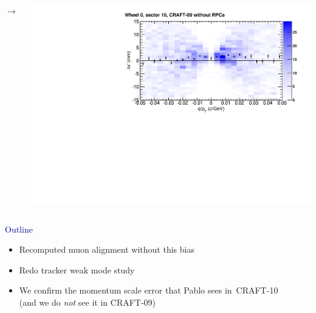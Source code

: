\documentclass[compress]{beamer}
\begin{document}
\begin{frame}
\begin{columns}
$\mathbf{\to}$

\includegraphics[width=0.9\linewidth]{globaldistort_noRPC.pdf}
\end{columns}

\vspace{0.2 cm}
\hspace{-0.83 cm} \textcolor{darkblue}{\Large Outline}

\begin{itemize}
\item Recomputed muon alignment without this bias
\item Redo tracker weak mode study
\item We confirm the momentum scale error that Pablo sees \mbox{in CRAFT-10\hspace{-1 cm}} \\ (and we do {\it not} see it in CRAFT-09)
\end{itemize}
\end{frame}
\end{document}
